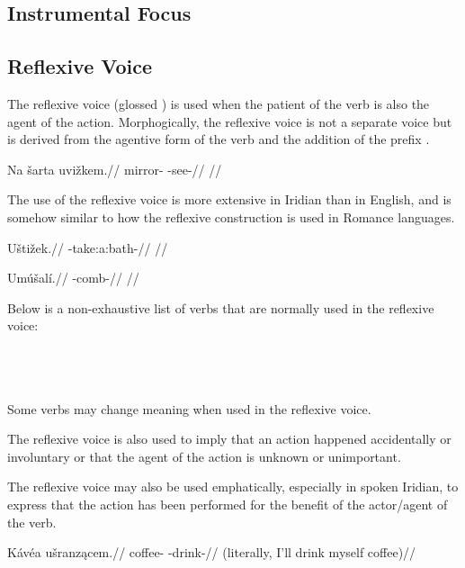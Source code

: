 \subsection{Instrumental Focus}


\subsection{Reflexive Voice}

The reflexive voice (glossed ) is used when the patient of the verb is also the agent of the action. Morphogically, the reflexive voice is not a separate voice but is derived from the agentive form of the verb and the addition of the prefix .

\pex
\begingl
\gla Na \v{s}arta uvi\v{z}kem.//
\glb {} mirror- -see-//
\glft {}//
\endgl
\xe

The use of the reflexive voice is more extensive in Iridian than in English, and is somehow similar to how the reflexive construction is used in Romance languages.

\pex
\begingl
\gla U\v{s}ti\v{z}ek.//
\glb {}-take:a:bath-//
\glft {}//
\endgl
\xe

\pex
\begingl
\gla Um\'u\v{s}al\'i.//
\glb {}-comb-//
\glft {}//
\endgl
\xe

Below is a non-exhaustive list of verbs that are normally used in the reflexive voice:
\bigskip

\noindent
{} \\
 \\
 \\

Some verbs may change meaning when used in the reflexive voice.


The reflexive voice is also used to imply that an action happened accidentally or involuntary or that the agent of the action is unknown or unimportant.

The reflexive voice may also be used emphatically, especially in spoken Iridian, to express that the action has been performed for the benefit of the actor/agent of the verb.

\pex
\begingl
\gla K\'av\'ea u\v{s}ranz\k{a}cem.//
\glb coffee- -drink-//
\glft {} (literally, I'll drink myself coffee)//
\endgl
\xe

